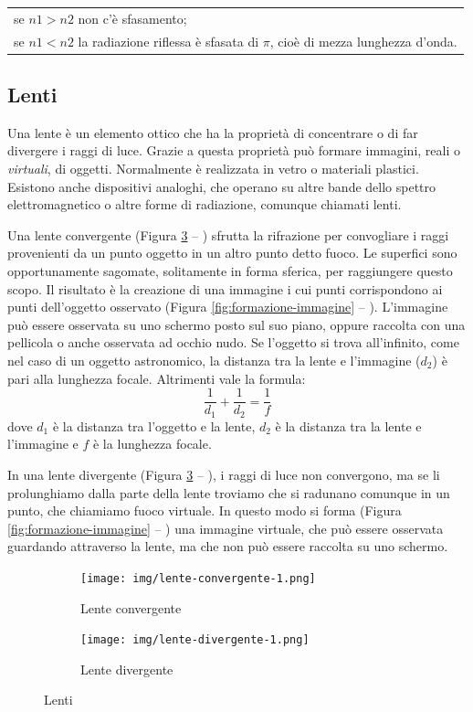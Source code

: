 \begin{tabular}{l}
se $n1>n2$ non c'è sfasamento;\\
se $n1<n2$ la radiazione riflessa è sfasata di $\pi$, cioè di mezza lunghezza d'onda.\\
\end{tabular}


\subsection{Lenti}
Una lente è un elemento ottico che ha la proprietà di concentrare o di far divergere i raggi di luce. Grazie a questa proprietà può formare immagini, reali o \emph{virtuali}, di oggetti.
Normalmente è realizzata in vetro o materiali plastici. Esistono anche dispositivi analoghi, che operano su altre bande dello spettro elettromagnetico o altre forme di radiazione, comunque chiamati lenti.

Una lente convergente (Figura \ref{fig:lenti} -- )
 sfrutta la rifrazione per convogliare i raggi provenienti da un
punto oggetto in un altro punto detto fuoco. Le superfici sono opportunamente
sagomate, solitamente in forma sferica, per raggiungere questo scopo. Il
risultato è la creazione di una immagine i cui punti corrispondono ai punti
dell'oggetto osservato (Figura \ref{fig:formazione-immagine} -- ). L'immagine può essere osservata su uno schermo
posto sul suo piano, oppure raccolta con una pellicola o anche osservata ad
occhio nudo. Se l'oggetto si trova all'infinito, come nel caso di un oggetto
astronomico, la distanza tra la lente e l'immagine ($d_2$) è pari alla
lunghezza focale. Altrimenti vale la formula:   \[ \frac{1}{d_1} +
\frac{1}{d_2} = \frac{1}{f} \] dove $d_1$ è la distanza tra l'oggetto e la
lente, $d_2$ è la distanza tra la lente e l'immagine e $f$ è la lunghezza
focale.

In una lente divergente (Figura \ref{fig:lenti} -- ),
i raggi di luce non convergono, ma se li prolunghiamo dalla
parte della lente troviamo che si radunano comunque in un punto, che chiamiamo
fuoco virtuale. In questo modo si forma (Figura \ref{fig:formazione-immagine} -- ) una immagine virtuale, che può
essere osservata guardando attraverso la lente, ma che non può essere raccolta
su uno schermo.


\begin{figure}
\begin{subfigure}[b]{.5\textwidth}
\centering
\texttt{[image: img/lente-convergente-1.png]}
\caption{Lente convergente}\label{fig:lente-convergente}
\end{subfigure}
\begin{subfigure}[b]{.5\textwidth}
\centering
\texttt{[image: img/lente-divergente-1.png]}
\caption{Lente divergente}\label{fig:lente-divergente}
\end{subfigure}
\caption{Lenti}
\label{fig:lenti}
\end{figure}

